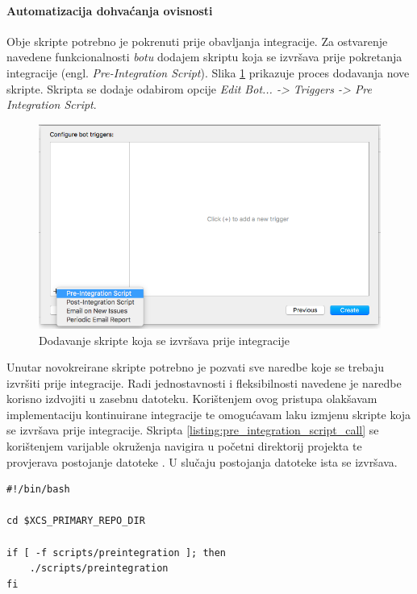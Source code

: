 \documentclass[times, utf8, diplomski, numeric]{fer}
\newcommand{\eng}[1]{(engl. \textit{#1})}
\begin{document}
\paragraph{Automatizacija dohvaćanja ovisnosti}

Obje skripte potrebno je pokrenuti prije obavljanja integracije. Za ostvarenje navedene funkcionalnosti \textit{botu} dodajem skriptu koja se izvršava prije pokretanja integracije \eng{Pre-Integration Script}. Slika \ref{fig:PreIntegrationScript} prikazuje proces dodavanja nove skripte. Skripta se dodaje odabirom opcije \textit{Edit Bot... -> Triggers -> Pre Integration Script}.

\begin{figure}[b!]
\centering
\includegraphics[scale=0.5]{PreIntegrationScript}
\caption{Dodavanje skripte koja se izvršava prije integracije}
\label{fig:PreIntegrationScript}
\end{figure}

Unutar novokreirane skripte potrebno je pozvati sve naredbe koje se trebaju izvršiti prije integracije. Radi jednostavnosti i fleksibilnosti navedene je naredbe korisno izdvojiti u zasebnu datoteku. Korištenjem ovog pristupa olakšavam implementaciju kontinuirane integracije te omogućavam laku izmjenu skripte koja se izvršava prije integracije. Skripta \ref{listing:pre_integration_script_call} se korištenjem  varijable okruženja navigira u početni direktorij projekta te provjerava postojanje datoteke . U slučaju postojanja datoteke ista se izvršava.

\begin{lstlisting}[caption=Poziv skripte koja se izvršava prije obavljanja integracije, label=listing:pre_integration_script_call]
#!/bin/bash

cd $XCS_PRIMARY_REPO_DIR

if [ -f scripts/preintegration ]; then
    ./scripts/preintegration
fi
\end{lstlisting}
\end{document}
